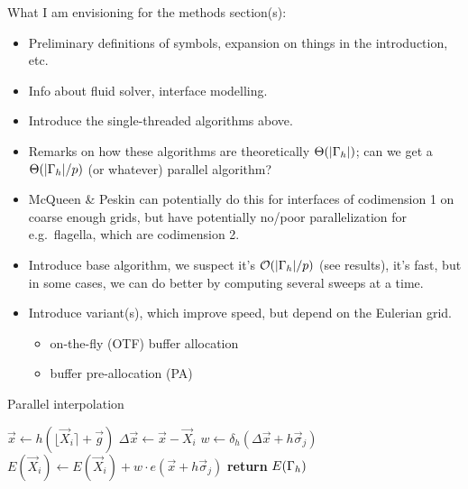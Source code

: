 \clearpage

\bgroup
\color{red}
What I am envisioning for the methods section(s):
\begin{itemize}
    \item Preliminary definitions of symbols, expansion on things in the
        introduction, etc.
    \item Info about fluid solver, interface modelling.
    \item Introduce the single-threaded algorithms above.
    \item Remarks on how these algorithms are theoretically $\Theta(|\Gamma_h|)$;
        can we get a $\Theta(|\Gamma_h|/p)$ (or whatever) parallel algorithm?
    \item McQueen \& Peskin can potentially do this for interfaces of codimension 1
        on coarse enough grids, but have potentially no/poor parallelization for
        e.g.\ flagella, which are codimension 2.
    \item Introduce base algorithm, we suspect it's $\mathcal{O}(|\Gamma_h|/p)$ (see results),
        it's fast, but in some cases, we can do better by computing several sweeps at a time.
    \item Introduce variant(s), which improve speed, but depend on the Eulerian grid.
        \begin{itemize}
            \item on-the-fly (OTF) buffer allocation
            \item buffer pre-allocation (PA)
        \end{itemize}
\end{itemize}


\begin{algorithm}
\caption{Parallel interpolation}
\label{algo:par-interp}
\begin{algorithmic}

    \State $\vec{x} \gets h(\lfloor\vec{X}_i\rceil+\vec{g})$
    \State $\Delta\vec{x} \gets \vec{x}-\vec{X}_i$
        \State $w \gets \delta_h(\Delta\vec{x}+h\vec{\sigma}_j)$
        \State $E(\vec{X}_i) \gets E(\vec{X}_i) + w \cdot e(\vec{x}+h\vec{\sigma}_j)$
    \EndFor
\EndFor
\State \textbf{return} $E(\Gamma_h)$
\EndProcedure
\end{algorithmic}
\end{algorithm}

